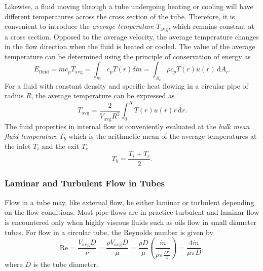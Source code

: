 Likewise, a fluid moving through a tube undergoing heating or cooling will have different temperatures across the cross section of the tube.
Therefore, it is convenient to introduce the \textit{average temperature} $T_{\mathrm{avg}}$, which remains constant at a cross section.
Opposed to the average velocity, the average temperature changes in the flow direction when the fluid is heated or cooled.
The value of the average temperature can be determined using the principle of conservation of energy as 
\begin{equation*}
  \dot{E}_{\mathrm{fluid}} = \dot{m} c_p T_{\mathrm{avg}} = \int_{\dot{m}} c_p T(r) \delta \dot{m} = \int_{A_c} \rho c_p T(r) u(r) \, \mathrm{d}A_c
.\end{equation*}
For a fluid with constant density and specific heat flowing in a circular pipe of radius $R$, the average temperature can be expressed as 
\begin{equation*}
  T_{\mathrm{avg}} = \frac{2}{V_{\mathrm{avg}} R^2} \int_{0}^{R} T(r) u(r) r \, \mathrm{d}r
.\end{equation*}
The fluid properties in internal flow is conveniently evaluated at the \textit{bulk mean fluid temperature} $T_b$ which is the arithmetic mean of the average temperatures at the inlet $T_i$ and the exit $T_e$ 
\begin{equation*}
  T_b = \frac{T_i + T_e}{2}
.\end{equation*}

\subsubsection{Laminar and Turbulent Flow in Tubes}
Flow in a tube may, like external flow, be either laminar or turbulent depending on the flow conditions.
Most pipe flows are in practice turbulent and laminar flow is encountered only when highly viscous fluids such as oils flow in small diameter tubes.
For flow in a circular tube, the Reynolds number is given by 
\begin{equation*}
  \mathrm{Re} = \frac{V_{\mathrm{avg}} D}{\nu} = \frac{\rho V_{\mathrm{avg}} D}{\mu} = \frac{\rho D}{\mu} \left( \frac{\dot{m}}{\rho \pi \frac{D^2}{4}} \right) = \frac{4\dot{m}}{\mu \pi D}
,\end{equation*}
where $D$ is the tube diameter.

